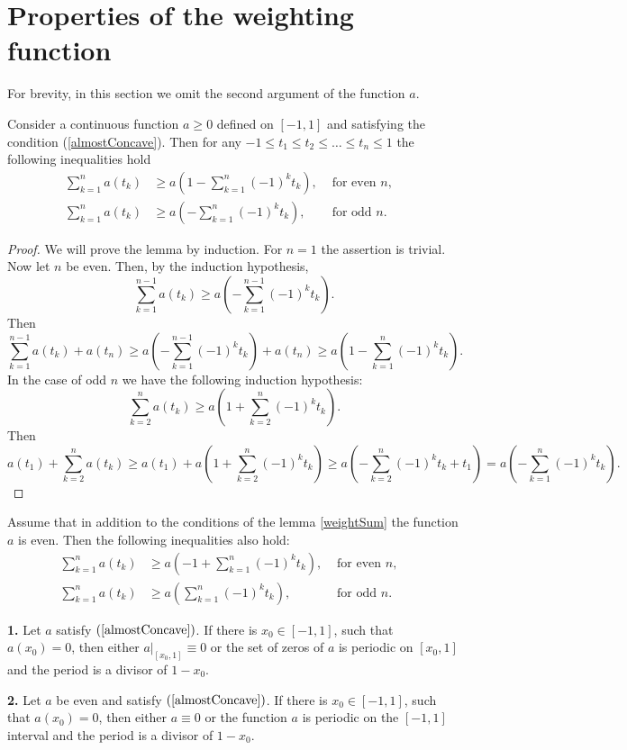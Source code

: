 \section{Properties of the weighting function }

For brevity, in this section we omit the second argument of the function $a$.

\begin{lm}
\label{weightSum}
Consider a continuous function $a \ge 0$ defined on $[-1, 1]$
and satisfying the condition (\ref{almostConcave}).
Then for any $-1 \le t_1 \le t_2 \le \ldots \le t_n \le 1$
the following inequalities hold
\begin{align*}
\sum_{k = 1}^n a(t_k) & \ge a( 1 - \sum_{k = 1}^n (-1)^k t_k), & \text{ for even $n$}, & \\
\sum_{k = 1}^n a(t_k) & \ge a(- \sum_{k = 1}^n (-1)^k t_k), & \text{ for odd $n$}. &
\end{align*}
\end{lm}

\begin{proof}
We will prove the lemma by induction.
For $n = 1$ the assertion is trivial.
Now let $n$ be even. Then, by the induction hypothesis,
$$\sum_{k=1}^{n - 1} a(t_k) \ge a( -\sum_{k = 1}^{n - 1} (-1)^k t_k ).$$
Then
$$\sum_{k = 1}^{n - 1} a( t_k ) + a( t_n ) \ge a( -\sum_{k = 1}^{n - 1} (-1)^k t_k ) + a( t_n ) \ge
a( 1 - \sum_{k = 1}^{n} (-1)^k t_k ).$$
In the case of odd $n$ we have the following induction hypothesis:
$$\sum_{k=2}^n a(t_k) \ge a( 1 + \sum_{k = 2}^n (-1)^k t_k ).$$
Then
$$a( t_1 ) + \sum_{k = 2}^n a( t_k ) \ge a( t_1 ) + a( 1 + \sum_{k = 2}^{n} (-1)^k t_k ) \ge
a( -\sum_{k = 2}^{n} (-1)^k t_k + t_1 ) = a( -\sum_{k = 1}^{n} (-1)^k t_k ).$$
\end{proof}

\begin{rem}
Assume that in addition to the conditions of the lemma \ref{weightSum} the function $a$ is even.
Then the following inequalities also hold:
\label{almostConcaveMultRem}
\begin{align*}
\sum_{k = 1}^na(t_k) & \ge a(-1 + \sum_{k = 1}^n (-1)^k t_k), & \text{ for even $n$}, & \\
\sum_{k = 1}^na(t_k) & \ge a(\sum_{k = 1}^n (-1)^k t_k), & \text{ for odd $n$}. &
\end{align*}
\end{rem}

\begin{lm}
\label{periodicity}
{\bf 1.} Let $a$ satisfy $(\ref{almostConcave})$.
If there is $x_0 \in [-1, 1]$, such that $a(x_0) = 0$,
then either $a\Big |_{[x_0, 1]} \equiv 0$
or the set of zeros of $a$ is periodic on $[x_0, 1]$
and the period is a divisor of $1 - x_0$.

{\bf 2.} Let $a$ be even and satisfy $(\ref{almostConcave})$.
If there is $x_0 \in [-1, 1]$, such that $a(x_0) = 0$,
then either $a \equiv 0$
or the function $a$ is periodic on the $[-1, 1]$ interval
and the period is a divisor of $1 - x_0$.
\end{lm}


